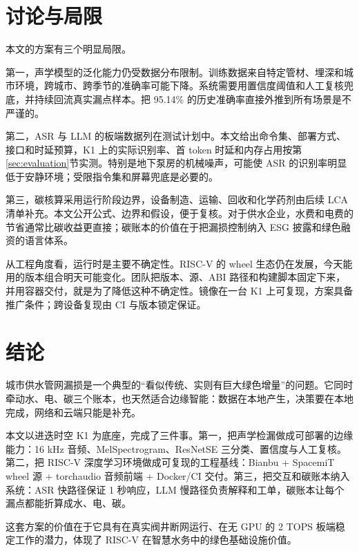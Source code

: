 \documentclass[UTF8,11pt,a4paper,fontset=none]{ctexart}
\begin{document}
\section{讨论与局限}
\label{sec:discussion}

本文的方案有三个明显局限。

第一，声学模型的泛化能力仍受数据分布限制。训练数据来自特定管材、埋深和城市环境，跨城市、跨季节的准确率可能下降。系统需要用置信度阈值和人工复核兜底，并持续回流真实漏点样本。把 95.14\% 的历史准确率直接外推到所有场景是不严谨的。

第二，ASR 与 LLM 的板端数据列在测试计划中。本文给出命令集、部署方式、接口和时延预算，K1 上的实际识别率、首 token 时延和内存占用按第\ref{sec:evaluation}节实测。特别是地下泵房的机械噪声，可能使 ASR 的识别率明显低于安静环境；受限指令集和屏幕兜底是必要的。

第三，碳核算采用运行阶段边界，设备制造、运输、回收和化学药剂由后续 LCA 清单补充。本文公开公式、边界和假设，便于复核。对于供水企业，水费和电费的节省通常比碳收益更直接；碳账本的价值在于把漏损控制纳入 ESG 披露和绿色融资的语言体系。

从工程角度看，运行时是主要不确定性。RISC-V 的 wheel 生态仍在发展，今天能用的版本组合明天可能变化。团队把版本、源、ABI 路径和构建脚本固定下来，并用容器交付，就是为了降低这种不确定性。镜像在一台 K1 上可复现，方案具备推广条件；跨设备复现由 CI 与版本锁定保证。

\section{结论}
\label{sec:conclusion}

城市供水管网漏损是一个典型的“看似传统、实则有巨大绿色增量”的问题。它同时牵动水、电、碳三个账本，也天然适合边缘智能：数据在本地产生，决策要在本地完成，网络和云端只能是补充。

本文以进迭时空 K1 为底座，完成了三件事。第一，把声学检漏做成可部署的边缘能力：16 kHz 音频、MelSpectrogram、ResNetSE 三分类、置信度与人工复核。第二，把 RISC-V 深度学习环境做成可复现的工程基线：Bianbu + SpacemiT wheel 源 + torchaudio 音频前端 + Docker/CI 交付。第三，把交互和碳账本纳入系统：ASR 快路径保证 1 秒响应，LLM 慢路径负责解释和工单，碳账本让每个漏点都能折算成水、电、碳。

这套方案的价值在于它具有在真实阀井断网运行、在无 GPU 的 2 TOPS 板端稳定工作的潜力，体现了 RISC-V 在智慧水务中的绿色基础设施价值。
\end{document}
